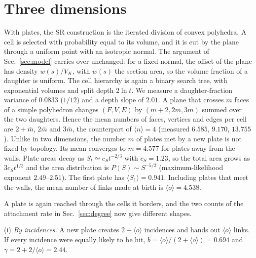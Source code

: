 \documentclass[pre,twocolumn,superscriptaddress,amsmath,amssymb,floatfix]{revtex4-2}
\begin{document}
\section{Three dimensions}
\label{sec:3d}
With plates, the SR construction is the iterated division of convex polyhedra. A cell
is selected with probability equal to its volume, and it is cut by the plane through a
uniform point with an isotropic normal. The argument of Sec.~\ref{sec:model} carries over
unchanged: for a fixed normal, the offset of the plane has density $w(s)/V_K$, with $w(s)$
the section area, so the volume fraction of a daughter is uniform. The cell hierarchy is
again a binary search tree, with exponential volumes and split depth $2\ln t$. We measure
a daughter-fraction variance of $0.0833$ ($1/12$) and a depth slope of $2.01$. A plane that
crosses $m$ faces of a simple polyhedron changes $(F,V,E)$ by $(m+2,2m,3m)$ summed over the
two daughters. Hence the mean numbers of faces, vertices and edges per cell are
$2+\bar m$, $2\bar m$ and $3\bar m$, the counterpart of $\langle n\rangle=4$ (measured
$6.585$, $9.170$, $13.755$). Unlike in two dimensions, the number $m$ of plates met by a new
plate is not fixed by topology. Its mean converges to $\bar m=4.577$ for plates away from
the walls. Plate areas decay as $S_t\simeq c_St^{-2/3}$ with $c_S=1.23$, so the total area
grows as $3c_St^{1/3}$ and the area distribution is $P(S)\sim S^{-5/2}$ (maximum-likelihood
exponent $2.49$--$2.51$). The first plate has $\langle S_1\rangle=0.941$. Including plates
that meet the walls, the mean number of links made at birth is $\langle o\rangle=4.538$.

A plate is again reached through the cells it borders, and the two counts of the
attachment rate in Sec.~\ref{sec:degree} now give different shapes.

(i) \emph{By incidences.} A new plate creates $2+\langle o\rangle$ incidences and hands out
$\langle o\rangle$ links. If every incidence were equally likely to be hit,
$b=\langle o\rangle/(2+\langle o\rangle)=0.694$ and $\gamma=2+2/\langle o\rangle=2.44$.
\end{document}
